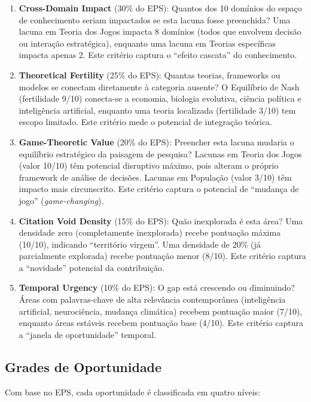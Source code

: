 \documentclass[12pt,a4paper]{article}
\begin{document}
\begin{enumerate}[itemsep=2pt]
  \item \textbf{Cross-Domain Impact} (30\% do EPS): Quantos dos 10 domínios do espaço de conhecimento seriam impactados se esta lacuna fosse preenchida? Uma lacuna em Teoria dos Jogos impacta 8 domínios (todos que envolvem decisão ou interação estratégica), enquanto uma lacuna em Teorias específicas impacta apenas 2. Este critério captura o ``efeito cascata'' do conhecimento.
  \item \textbf{Theoretical Fertility} (25\% do EPS): Quantas teorias, frameworks ou modelos se conectam diretamente à categoria ausente? O Equilíbrio de Nash (fertilidade 9/10) conecta-se a economia, biologia evolutiva, ciência política e inteligência artificial, enquanto uma teoria localizada (fertilidade 3/10) tem escopo limitado. Este critério mede o potencial de integração teórica.
  \item \textbf{Game-Theoretic Value} (20\% do EPS): Preencher esta lacuna mudaria o equilíbrio estratégico da paisagem de pesquisa? Lacunas em Teoria dos Jogos (valor 10/10) têm potencial disruptivo máximo, pois alteram o próprio framework de análise de decisões. Lacunas em População (valor 3/10) têm impacto mais circunscrito. Este critério captura o potencial de ``mudança de jogo'' (\textit{game-changing}).
  \item \textbf{Citation Void Density} (15\% do EPS): Quão inexplorada é esta área? Uma densidade zero (completamente inexplorada) recebe pontuação máxima (10/10), indicando ``território virgem''. Uma densidade de 20\% (já parcialmente explorada) recebe pontuação menor (8/10). Este critério captura a ``novidade'' potencial da contribuição.
  \item \textbf{Temporal Urgency} (10\% do EPS): O gap está crescendo ou diminuindo? Áreas com palavras-chave de alta relevância contemporânea (inteligência artificial, neurociência, mudança climática) recebem pontuação maior (7/10), enquanto áreas estáveis recebem pontuação base (4/10). Este critério captura a ``janela de oportunidade'' temporal.
\end{enumerate}

\subsection{Grades de Oportunidade}

Com base no EPS, cada oportunidade é classificada em quatro níveis:
\end{document}
